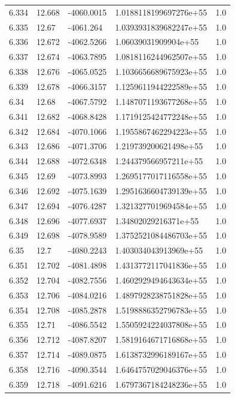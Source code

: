 \begin{tabular}{lllll}
6.334 & 12.668 & -4060.0015 & 1.0188118199697276e+55 & 1.0 \\
6.335 & 12.67 & -4061.264 & 1.0393931839682247e+55 & 1.0 \\
6.336 & 12.672 & -4062.5266 & 1.06039031909904e+55 & 1.0 \\
6.337 & 12.674 & -4063.7895 & 1.0818116244962507e+55 & 1.0 \\
6.338 & 12.676 & -4065.0525 & 1.1036656689675923e+55 & 1.0 \\
6.339 & 12.678 & -4066.3157 & 1.1259611944222589e+55 & 1.0 \\
6.34 & 12.68 & -4067.5792 & 1.1487071193677268e+55 & 1.0 \\
6.341 & 12.682 & -4068.8428 & 1.1719125424772248e+55 & 1.0 \\
6.342 & 12.684 & -4070.1066 & 1.1955867462294223e+55 & 1.0 \\
6.343 & 12.686 & -4071.3706 & 1.219739200621498e+55 & 1.0 \\
6.344 & 12.688 & -4072.6348 & 1.244379566957211e+55 & 1.0 \\
6.345 & 12.69 & -4073.8993 & 1.2695177017116558e+55 & 1.0 \\
6.346 & 12.692 & -4075.1639 & 1.2951636604739139e+55 & 1.0 \\
6.347 & 12.694 & -4076.4287 & 1.3213277019694584e+55 & 1.0 \\
6.348 & 12.696 & -4077.6937 & 1.34802029216371e+55 & 1.0 \\
6.349 & 12.698 & -4078.9589 & 1.3752521084486703e+55 & 1.0 \\
6.35 & 12.7 & -4080.2243 & 1.403034043913969e+55 & 1.0 \\
6.351 & 12.702 & -4081.4898 & 1.4313772117041836e+55 & 1.0 \\
6.352 & 12.704 & -4082.7556 & 1.4602929494643634e+55 & 1.0 \\
6.353 & 12.706 & -4084.0216 & 1.4897928238751828e+55 & 1.0 \\
6.354 & 12.708 & -4085.2878 & 1.5198886352796783e+55 & 1.0 \\
6.355 & 12.71 & -4086.5542 & 1.5505924224037808e+55 & 1.0 \\
6.356 & 12.712 & -4087.8207 & 1.5819164671716868e+55 & 1.0 \\
6.357 & 12.714 & -4089.0875 & 1.6138732996189167e+55 & 1.0 \\
6.358 & 12.716 & -4090.3544 & 1.6464757029046376e+55 & 1.0 \\
6.359 & 12.718 & -4091.6216 & 1.6797367184248236e+55 & 1.0 \\

\end{tabular}
